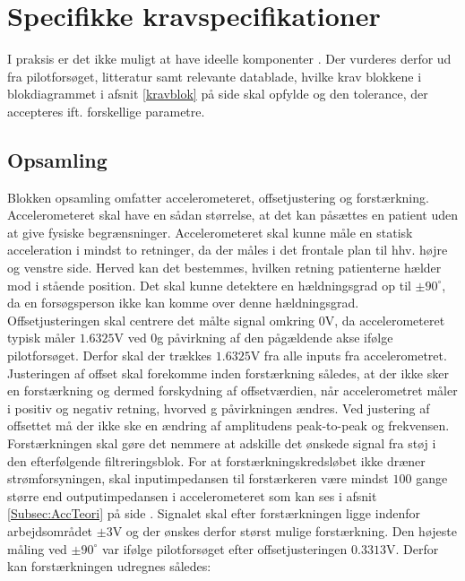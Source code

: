 \section{Specifikke kravspecifikationer}
I praksis er det ikke muligt at have ideelle komponenter \cite{Nilsson2011}. Der vurderes derfor ud fra pilotforsøget, litteratur samt relevante datablade, hvilke krav blokkene i blokdiagrammet i afsnit \ref{kravblok} på side \pageref{kravblok} skal opfylde og den tolerance, der accepteres ift. forskellige parametre.

\subsection{Opsamling}\label{OpsamlingsAfs}
Blokken opsamling omfatter accelerometeret, offsetjustering og forstærkning. Accelerometeret skal have en sådan størrelse, at det kan påsættes en patient uden at give fysiske begrænsninger. Accelerometeret skal kunne måle en statisk acceleration i mindst to retninger, da der måles i det frontale plan til hhv. højre og venstre side. Herved kan det bestemmes, hvilken retning patienterne hælder mod i stående position. Det skal kunne detektere en hældningsgrad op til $\pm90^{\circ}$, da en forsøgsperson ikke kan komme over denne hældningsgrad. \\
Offsetjusteringen skal centrere det målte signal omkring $0$V, da accelerometeret typisk måler $1.6325$V ved $0$g påvirkning af den pågældende akse ifølge pilotforsøget. Derfor skal der trækkes $1.6325$V fra alle inputs fra accelerometret. Justeringen af offset skal forekomme inden forstærkning således, at der ikke sker en forstærkning og dermed forskydning af offsetværdien, når accelerometret måler i positiv og negativ retning, hvorved g påvirkningen ændres. Ved justering af offsettet må der ikke ske en ændring af amplitudens peak-to-peak og frekvensen. \\
Forstærkningen skal gøre det nemmere at adskille det ønskede signal fra støj i den efterfølgende filtreringsblok. For at forstærkningskredsløbet ikke dræner strømforsyningen, skal inputimpedansen til forstærkeren være mindst $100$ gange større end outputimpedansen i accelerometeret som kan ses i afsnit \ref{Subsec:AccTeori} på side \pageref{Subsec:AccTeori}. Signalet skal efter forstærkningen ligge indenfor arbejdsområdet $\pm3$V og der ønskes derfor størst mulige forstærkning. Den højeste måling ved $\pm90^{\circ}$ var ifølge pilotforsøget efter offsetjusteringen $0.3313$V. Derfor kan forstærkningen udregnes således:
